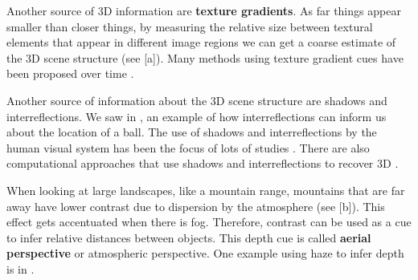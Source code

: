 Another source of 3D information are {\bf texture gradients}. As far things appear smaller than closer things, by measuring the relative size between textural elements that appear in different image regions we can get a coarse estimate of the 3D scene structure (see \fig{\ref{fig:aerial_perspective}}[a]). Many methods using texture gradient cues have been proposed over time \cite{Witkin81}.

Another source of information about the 3D scene structure are shadows and interreflections. We saw in \chap{\ref{chap:looking_at_images}}, \fig{\ref{fig:cues_for_suppport}} an example of how interreflections can inform us about the location of a ball. The use of shadows and interreflections by the human visual system has been the focus of lots of studies \cite{Knill97,Madison2001}. There are also computational approaches that use shadows and interreflections to recover 3D \cite{Nayar1991,Karnieli2022}.

When looking at large landscapes, like a mountain range, mountains that are far away have lower contrast due to dispersion by the atmosphere (see \fig{\ref{fig:aerial_perspective}}[b]). This effect gets accentuated when there is fog. Therefore, contrast can be used as a cue to infer relative distances between objects. This depth cue is called {\bf aerial perspective} or atmospheric perspective. One example using haze to infer depth is in \cite{Kaiming2009}.


